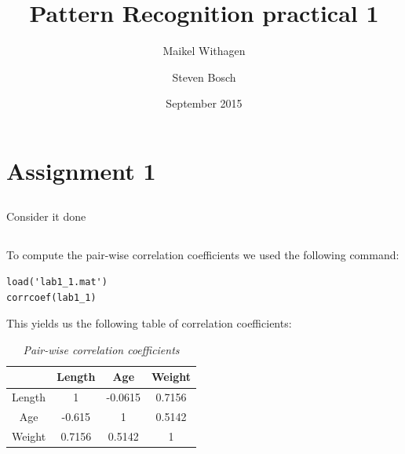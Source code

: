 \documentclass{article}
\title{Pattern Recognition practical 1}
\author{Maikel Withagen \and Steven Bosch}
\date{September 2015}
\begin{document}
\maketitle

\section{Assignment 1}
\subsection{}
Consider it done
\subsection{}
To compute the pair-wise correlation coefficients we used the following command:
\begin{lstlisting}[title= Input]
load('lab1_1.mat')
corrcoef(lab1_1)
\end{lstlisting}
This yields us the following table of correlation coefficients:
\begin{table}[H]
\caption{\textit{Pair-wise correlation coefficients}}
\vspace{0.1cm}
\centering
\begin{tabular}{|c|c|c|c|}
\hline
 & Length & Age & Weight \\
\hline
Length & 1 & -0.0615 & 0.7156 \\
\hline
Age & -0.615 & 1 & 0.5142 \\
\hline
Weight & 0.7156 & 0.5142 & 1 \\ 
\hline
\end{tabular}
\label{tab1.2}
\end{table}

\subsection{}
\end{document}
